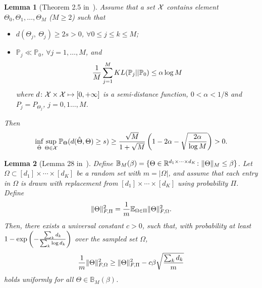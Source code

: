 \documentclass[11pt]{article}
\theoremstyle{plain}
\newtheorem{lem}{Lemma}
\theoremstyle{definition}
\providecommand{\DIFaddtex}[1]{{\protect\color{blue}\uwave{#1}}} %
\providecommand{\DIFdeltex}[1]{{\protect\color{red}\sout{#1}}}                      %
\providecommand{\DIFaddbegin}{} %
\providecommand{\DIFaddend}{} %
\providecommand{\DIFdelbegin}{} %
\providecommand{\DIFdelend}{} %
\providecommand{\DIFadd}[1]{\texorpdfstring{\DIFaddtex{#1}}{#1}} %
\providecommand{\DIFdel}[1]{\texorpdfstring{\DIFdeltex{#1}}{}} %
\begin{document}
\begin{lem}[Theorem 2.5 in~\cite{tsybakov2009introduction}]\label{lem:Tsybakov}
Assume that a set $\mathcal{X}$ contains element $\Theta_0, \Theta_1, \ldots,\Theta_M$ ($M\geq 2$) such that
 \begin{itemize} 
\item \DIFdelbegin \DIFdel{$d(\Theta_j,\ \Theta_j)\geq 2s>0$}\DIFdelend \DIFaddbegin \DIFadd{$d(\Theta_j,\ \Theta_k)\geq 2s>0$}\DIFaddend , $\forall 0\leq j\leq k\leq M$;
\item $\mathbb{P}_j\ll\mathbb{P}_0$, $\forall j=1,\ldots,M$, and
\[
{1\over M}\sum_{j=1}^M KL(\mathbb{P}_j||\mathbb{P}_0)\leq \alpha \log M
\]
where $d\colon \mathcal{X}\times \mathcal{X}\mapsto [0,+\infty]$ is a semi-distance function, $0<\alpha<{1/8}$ and $P_j=P_{\Theta_j}$, $j=0,1\ldots,M$.
 \end{itemize} 
Then
\[
\inf_{\hat \Theta}\sup_{\Theta\in\mathcal{X}} \mathbb{P}_{\Theta}(d(\hat \Theta, \Theta)\geq s)\geq {\sqrt{M}\over 1+\sqrt{M}}\left(1-2\alpha-\sqrt{2\alpha\over \log M} \right)>0.
\]
\end{lem}

\begin{lem}[Lemma 28 in~\cite{ghadermarzy2019near}]\label{lem:convexity}
Define $\mathbb{B}_{M}(\beta)=\{\Theta\in \mathbb{R}^{d_1\times \cdots \times d_K}\colon \lVert\Theta\rVert_M\leq \beta \}$.  Let $\Omega\subset[d_1]\times\cdots \times [d_K]$ be a random set with $m=|\Omega|$, and assume that each entry in $\Omega$ is drawn with replacement from $[d_1]\times\cdots\times[d_K]$ using probability $\Pi$. Define
\[
\lVert\Theta\rVert_{F,\Pi}^2={1\over m}\mathbb{E}_{\Omega\in\Pi}\lVert\Theta\rVert_{F,\Omega}^2.
\]
Then, there exists a universal constant $c>0$, such that, with probability at least $1-\exp\left(-{\sum_kd_k \over \sum_k \log d_k} \right)$ over the sampled set $\Omega$,
\[
{1\over m}\lVert\Theta\rVert_{F,\Omega}^2 \geq \lVert\Theta\rVert_{F,\Pi}^2-c\beta\sqrt{\sum_k d_k\over m}
\]
holds uniformly for all $\Theta\in\mathbb{B}_M(\beta)$.
\end{lem}
\DIFaddbegin 
\end{document}
